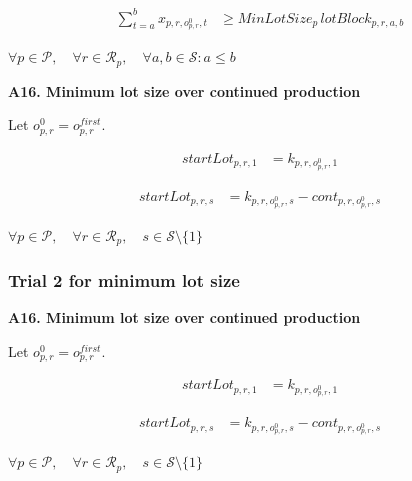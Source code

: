 \documentclass{article}
\begin{document}
\begin{align}
\sum_{t=a}^{b}
x_{p,r,o^0_{p,r},t}
&\ge
MinLotSize_p \, lotBlock_{p,r,a,b}
\label{eq:A16_min_lot_continued_block}
\end{align}
\begin{center}
$\forall p \in \mathcal{P}, \quad
\forall r \in \mathcal{R}_p, \quad
\forall a,b \in \mathcal{S}: a \le b$
\end{center}






\noindent\textbf{A16. Minimum lot size over continued production}

Let $o^0_{p,r}=o^{first}_{p,r}$.

\begin{align}
startLot_{p,r,1}
&=
k_{p,r,o^0_{p,r},1}
\label{eq:A16_start_lot_first_shift}
\end{align}

\begin{align}
startLot_{p,r,s}
&=
k_{p,r,o^0_{p,r},s}
-
cont_{p,r,o^0_{p,r},s}
\label{eq:A16_start_lot_cont}
\end{align}
\begin{center}
$\forall p \in \mathcal{P},\quad
\forall r \in \mathcal{R}_p,\quad
s \in \mathcal{S}\setminus\{1\}$
\end{center}



\pagebreak
\noindent\text{---------------------------------------------------------------------------------------------------------}


\subsubsection*{Trial 2 for minimum lot size}

\noindent\textbf{A16. Minimum lot size over continued production}

Let $o^0_{p,r}=o^{first}_{p,r}$.

\begin{align}
startLot_{p,r,1}
&=
k_{p,r,o^0_{p,r},1}
\label{eq:A16_start_lot_first_shift}
\end{align}

\begin{align}
startLot_{p,r,s}
&=
k_{p,r,o^0_{p,r},s}
-
cont_{p,r,o^0_{p,r},s}
\label{eq:A16_start_lot_cont}
\end{align}
\begin{center}
$\forall p \in \mathcal{P},\quad
\forall r \in \mathcal{R}_p,\quad
s \in \mathcal{S}\setminus\{1\}$
\end{center}
\end{document}
